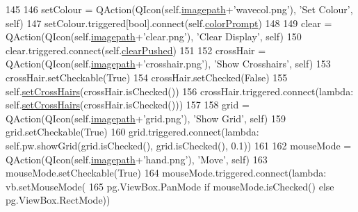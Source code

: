 \begin{DoxyCode}
145         
146         setColour = QAction(QIcon(self.\hyperlink{classsoftware_1_1chipwhisperer_1_1common_1_1ui_1_1GraphWidget_1_1GraphWidget_af56afe05df7285ee5568bddb9279c7dc}{imagepath}+\textcolor{stringliteral}{'wavecol.png'}),  \textcolor{stringliteral}{'Set Colour'},  self)
147         setColour.triggered[bool].connect(self.\hyperlink{classsoftware_1_1chipwhisperer_1_1common_1_1ui_1_1GraphWidget_1_1GraphWidget_a1d10774847432f66f8ec78ef5eee1c29}{colorPrompt})
148         
149         clear = QAction(QIcon(self.\hyperlink{classsoftware_1_1chipwhisperer_1_1common_1_1ui_1_1GraphWidget_1_1GraphWidget_af56afe05df7285ee5568bddb9279c7dc}{imagepath}+\textcolor{stringliteral}{'clear.png'}), \textcolor{stringliteral}{'Clear Display'}, self)
150         clear.triggered.connect(self.\hyperlink{classsoftware_1_1chipwhisperer_1_1common_1_1ui_1_1GraphWidget_1_1GraphWidget_abddfc4752a2084ee799b837c66798861}{clearPushed})
151 
152         crossHair = QAction(QIcon(self.\hyperlink{classsoftware_1_1chipwhisperer_1_1common_1_1ui_1_1GraphWidget_1_1GraphWidget_af56afe05df7285ee5568bddb9279c7dc}{imagepath}+\textcolor{stringliteral}{'crosshair.png'}), \textcolor{stringliteral}{'Show Crosshairs'}, self)
153         crossHair.setCheckable(\textcolor{keyword}{True})
154         crossHair.setChecked(\textcolor{keyword}{False})
155         self.\hyperlink{classsoftware_1_1chipwhisperer_1_1common_1_1ui_1_1GraphWidget_1_1GraphWidget_a26b9199e7feb7a55adc797519e436c50}{setCrossHairs}(crossHair.isChecked())
156         crossHair.triggered.connect(\textcolor{keyword}{lambda}: self.\hyperlink{classsoftware_1_1chipwhisperer_1_1common_1_1ui_1_1GraphWidget_1_1GraphWidget_a26b9199e7feb7a55adc797519e436c50}{setCrossHairs}(crossHair.isChecked()))
157 
158         grid = QAction(QIcon(self.\hyperlink{classsoftware_1_1chipwhisperer_1_1common_1_1ui_1_1GraphWidget_1_1GraphWidget_af56afe05df7285ee5568bddb9279c7dc}{imagepath}+\textcolor{stringliteral}{'grid.png'}), \textcolor{stringliteral}{'Show Grid'}, self)
159         grid.setCheckable(\textcolor{keyword}{True})
160         grid.triggered.connect(\textcolor{keyword}{lambda}: self.pw.showGrid(grid.isChecked(), grid.isChecked(), 0.1))
161 
162         mouseMode = QAction(QIcon(self.\hyperlink{classsoftware_1_1chipwhisperer_1_1common_1_1ui_1_1GraphWidget_1_1GraphWidget_af56afe05df7285ee5568bddb9279c7dc}{imagepath}+\textcolor{stringliteral}{'hand.png'}), \textcolor{stringliteral}{'Move'}, self)
163         mouseMode.setCheckable(\textcolor{keyword}{True})
164         mouseMode.triggered.connect(\textcolor{keyword}{lambda}: vb.setMouseMode(
165             pg.ViewBox.PanMode \textcolor{keywordflow}{if} mouseMode.isChecked() \textcolor{keywordflow}{else} pg.ViewBox.RectMode))

\end{DoxyCode}

